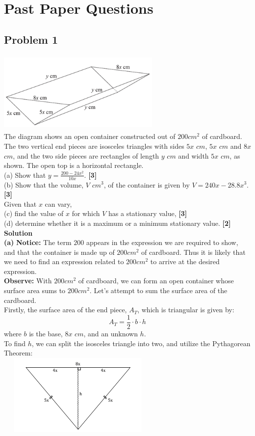 \documentclass[hidelinks, a4paper, 12pt]{article}
\newcommand{\bd}{\textbf}
\newcommand{\n}{\\[\baselineskip]}
\begin{document}
    \section{Past Paper Questions}
        \subsection{Problem 1}
            \includegraphics[width=8cm, height=4cm]{pp_prob_1}\n  
            The diagram shows an open container constructed out of $200cm^2$ of cardboard. The two vertical end pieces are isosceles triangles with
            sides $5x$ $cm$, $5x$ $cm$ and $8x$ $cm$, and the two side pieces are rectangles of length $y$ $cm$ and width $5x$ $cm$, as shown. The open
            top is a horizontal rectangle.\n
            (a) Show that $y = \frac{200-24x^2}{10x}$. \bd{[3]}\n
            (b) Show that the volume, $V$ $cm^3$, of the container is given by $V = 240x - 28.8x^3$. \bd{[3]}\n
            Given that $x$ can vary,\n
            (c) find the value of $x$ for which $V$ has a stationary value, \bd{[3]}\n
            (d) determine whether it is a maximum or a minimum stationary value. \bd{[2]}\n
            \bd{Solution}\n
            \bd{(a)} \bd{Notice:} The term $200$ appears in the expression we are required to show, and that the container is made up of $200cm^2$ of cardboard.
            Thus it is likely that we need to find an expression related to $200cm^2$ to arrive at the desired expression.\n
            \bd{Observe:} With $200cm^2$ of cardboard, we can form an open container whose surface area sums to $200cm^2$. Let's attempt to sum the surface area of the cardboard.\n
            Firstly, the surface area of the end piece, $A_T$, which is triangular is given by:
            \[A_T = \frac{1}{2}\cdot b \cdot h\]
            where $b$ is the base, $8x$ $cm$, and an unknown $h$.\n
            To find $h$, we can split the isosceles triangle into two, and utilize the Pythagorean Theorem:\n
            \includegraphics[width=8cm, height=4cm]{pp_prob_1_2}\n
\end{document}
